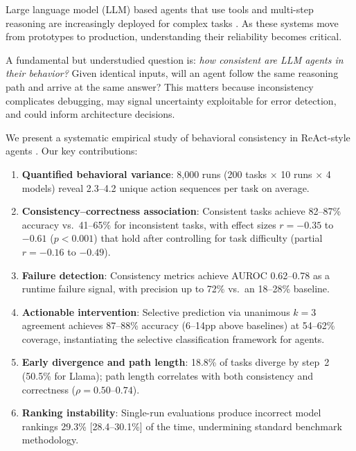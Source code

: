 \documentclass{article}
\begin{document}
Large language model (LLM) based agents that use tools and multi-step reasoning are increasingly deployed for complex tasks \citep{yao2022react, schick2023toolformer}. As these systems move from prototypes to production, understanding their reliability becomes critical.

A fundamental but understudied question is: \emph{how consistent are LLM agents in their behavior?} Given identical inputs, will an agent follow the same reasoning path and arrive at the same answer? This matters because inconsistency complicates debugging, may signal uncertainty exploitable for error detection, and could inform architecture decisions.

We present a systematic empirical study of behavioral consistency in ReAct-style agents \citep{yao2022react}. Our key contributions:

\begin{enumerate}
    \item \textbf{Quantified behavioral variance}: 8,000 runs (200 tasks $\times$ 10 runs $\times$ 4 models) reveal 2.3--4.2 unique action sequences per task on average.

    \item \textbf{Consistency--correctness association}: Consistent tasks achieve 82--87\% accuracy vs.\ 41--65\% for inconsistent tasks, with effect sizes $r=-0.35$ to $-0.61$ ($p<0.001$) that hold after controlling for task difficulty (partial $r=-0.16$ to $-0.49$).

    \item \textbf{Failure detection}: Consistency metrics achieve AUROC 0.62--0.78 as a runtime failure signal, with precision up to 72\% vs.\ an 18--28\% baseline.

    \item \textbf{Actionable intervention}: Selective prediction via unanimous $k\!=\!3$ agreement achieves 87--88\% accuracy (6--14pp above baselines) at 54--62\% coverage, instantiating the selective classification framework for agents.

    \item \textbf{Early divergence and path length}: 18.8\% of tasks diverge by step~2 (50.5\% for Llama); path length correlates with both consistency and correctness ($\rho=0.50$--$0.74$).

    \item \textbf{Ranking instability}: Single-run evaluations produce incorrect model rankings 29.3\% [28.4--30.1\%] of the time, undermining standard benchmark methodology.
\end{enumerate}
\end{document}
